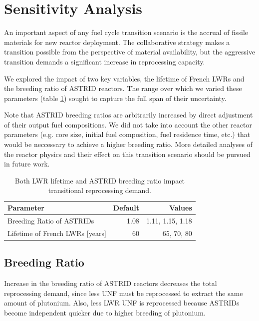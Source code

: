 \section{Sensitivity Analysis}

An important aspect of any fuel cycle transition scenario
is the accrual of fissile materials for new reactor deployment.
The collaborative strategy makes a transition possible 
from the perspective of material availability,
but the aggressive transition demands a significant increase in reprocessing capacity.

We explored the impact of two key variables, the lifetime of French \glspl{LWR} and the
breeding ratio of \gls{ASTRID} reactors. The range over which we varied these parameters (table \ref{tab:sen_par})
sought to capture the full span of their uncertainty.

Note that \gls{ASTRID} breeding ratios are arbitrarily increased
by direct adjustment of their output fuel compositions. We did not 
take into account the other reactor parameters (e.g. core size, initial
fuel composition, fuel residence time, etc.)
that would be neccessary to achieve a higher breeding ratio. More detailed analyses
of the reactor physics and their effect on this transition scenario 
should be pursued in future work.


\begin{table}[h]
    \centering
    \caption{Both \gls{LWR} lifetime and \gls{ASTRID} breeding ratio impact 
    transitional reprocessing demand.}
    \begin{tabularx}{\textwidth}{lrr}
        \hline
        \textbf{Parameter} & \textbf{Default} & \textbf{Values} \\
        \hline
        Breeding Ratio of \glspl{ASTRID} & 1.08 & 1.11, 1.15, 1.18 \\ 
        Lifetime of French \glspl{LWR} [years] & 60  & 65, 70, 80 \\
        \hline
    \end{tabularx}
    \label{tab:sen_par}
\end{table}

\subsection{Breeding Ratio}


Increase in the breeding ratio of \gls{ASTRID} reactors
decreases the total reprocessing demand, since less
\gls{UNF} must be reprocessed to extract the same amount of
plutonium. Also, less \gls{LWR} \gls{UNF} is reprocessed
because \glspl{ASTRID} become independent quicker due to
higher breeding of plutonium.


